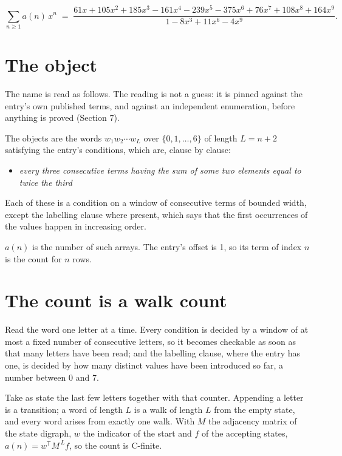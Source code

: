 \documentclass[11pt]{article}
\theoremstyle{definition}
\begin{document}
\[\sum_{n \ge 1} a(n)\,x^n \;=\; \frac{61x + 105x^{2} + 185x^{3} - 161x^{4} - 239x^{5} - 375x^{6} + 76x^{7} + 108x^{8} + 164x^{9}}{1 - 8x^{3} + 11x^{6} - 4x^{9}}.\]

\section{The object}

The name is read as follows. The reading is not a guess: it is pinned against the entry's own published terms, and against an independent enumeration, before anything is proved (Section 7).

The objects are the words $w_1 w_2 \cdots w_L$ over $\{0,1,\dots,6\}$ of length $L = n + 2$ satisfying the entry's conditions, which are, clause by clause:

\begin{itemize}

\item {\itshape every three consecutive terms having the sum of some two elements equal to twice the third}

\end{itemize}

Each of these is a condition on a window of consecutive terms of bounded width, except the labelling clause where present, which says that the first occurrences of the values happen in increasing order.

$a(n)$ is the number of such arrays. The entry's offset is 1, so its term of index $n$ is the count for $n$ rows.

\section{The count is a walk count}

Read the word one letter at a time. Every condition is decided by a window of at most a fixed number of consecutive letters, so it becomes checkable as soon as that many letters have been read; and the labelling clause, where the entry has one, is decided by how many distinct values have been introduced so far, a number between $0$ and 7.

Take as state the last few letters together with that counter. Appending a letter is a transition; a word of length $L$ is a walk of length $L$ from the empty state, and every word arises from exactly one walk. With $M$ the adjacency matrix of the state digraph, $w$ the indicator of the start and $f$ of the accepting states, $a(n) = w^{\mathsf T}M^{\,L}f$, so the count is C-finite.
\end{document}
